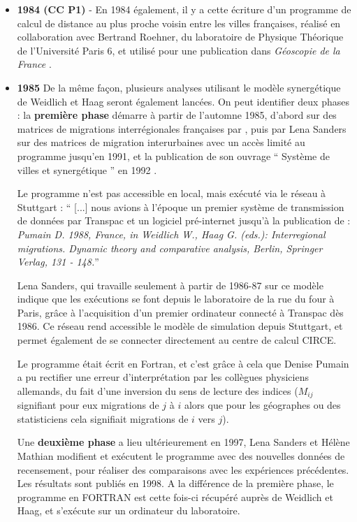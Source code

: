 \begin{itemize}[label=\textbullet]
\item \textbf{1984 (CC P1)} - En 1984 également, il y a cette écriture d’un programme de calcul de distance au plus proche voisin entre les villes françaises, réalisé en collaboration avec Bertrand Roehner, du laboratoire de Physique Théorique de l’Université Paris 6, et utilisé pour une publication dans \textit{Géoscopie de la France} \autocite{Quant1984}.

\item \textbf{1985} De la même façon, plusieurs analyses utilisant le modèle synergétique de Weidlich et Haag seront également lancées. On peut identifier deux phases : la \textbf{première phase} démarre à partir de l’automne 1985, d’abord sur des matrices de migrations interrégionales françaises par \textcite{Pumain1987}, puis par Lena Sanders sur des matrices de migration interurbaines avec un accès limité au programme jusqu’en 1991, et la publication de son ouvrage \enquote{ Système de villes et synergétique } en 1992 \autocite{Sanders1992}.

Le programme n'est pas accessible en local, mais exécuté via le réseau à Stuttgart : \enquote{ [...] nous avions à l’époque un premier système de transmission de données par Transpac et un logiciel pré-internet jusqu’à la publication de \autocite{Pumain1988} : \textit{Pumain D. 1988, France, in Weidlich W., Haag G. (eds.): Interregional migrations. Dynamic theory and comparative analysis, Berlin, Springer Verlag, 131 - 148.}}

Lena Sanders, qui travaille seulement à partir de 1986-87 sur ce modèle indique que les exécutions se font depuis le laboratoire de la rue du four à Paris, grâce à l'acquisition d'un premier ordinateur connecté à Transpac dès 1986. Ce réseau rend accessible le modèle de simulation depuis Stuttgart, et permet également de se connecter directement au centre de calcul CIRCE.

Le programme était écrit en Fortran, et c’est grâce à cela que Denise Pumain a pu rectifier une erreur d’interprétation par les collègues physiciens allemands, du fait d’une inversion du sens de lecture des indices ($M_{ij}$ signifiant pour eux migrations de $j$ à $i$ alors que pour les géographes ou des statisticiens cela signifiait migrations de $i$ vers $j$).

Une \textbf{deuxième phase} a lieu ultérieurement en 1997, Lena Sanders et Hélène Mathian modifient et exécutent le programme avec des nouvelles données de recensement, pour réaliser des comparaisons avec les expériences précédentes. Les résultats sont publiés en 1998. A la différence de la première phase, le programme en FORTRAN est cette fois-ci récupéré auprès de Weidlich et Haag, et s'exécute sur un ordinateur du laboratoire.


\end{itemize}
